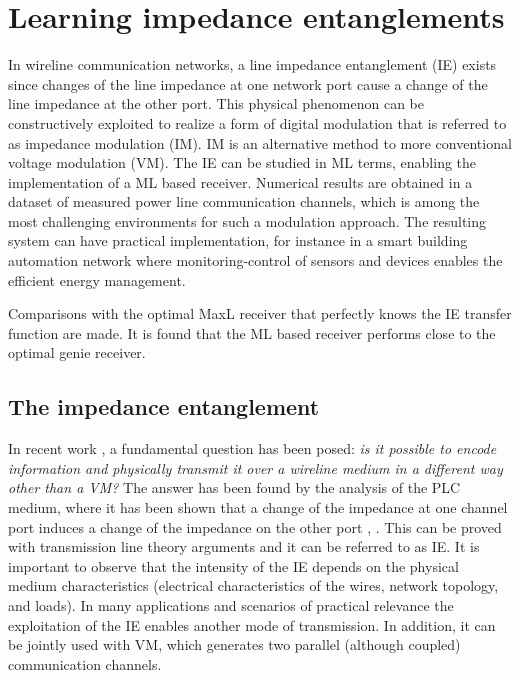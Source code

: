 \section{Learning impedance entanglements}
\label{sec:plc_entanglement}
In wireline communication networks, a line impedance entanglement (IE) exists since changes of the line impedance at one network port cause a change of the line impedance at the other port. This physical phenomenon can be constructively exploited to realize a form of digital modulation that is referred to as impedance modulation (IM). IM is an alternative method to more conventional voltage modulation (VM). The IE can be studied in ML terms, enabling the implementation of a ML based receiver. Numerical results are obtained in a dataset of measured power line communication channels, which is among the most challenging environments for such a modulation approach. The resulting system can have practical implementation, for instance in a smart building automation network where monitoring-control of sensors and devices enables the efficient energy management.

Comparisons with the optimal MaxL receiver that perfectly knows the IE transfer function are made. It is found that the ML based receiver performs close to the optimal genie receiver.

\subsection{The impedance entanglement}
In recent work \cite{TonelloIsplc2020}, a fundamental question has been posed: \emph{is it possible to encode information and physically transmit it over a wireline medium in a different way other than a VM?} The answer has been found by the analysis of the PLC medium, where it has been shown that a change of the impedance at one channel port induces a change of the impedance on the other port \cite{tcas}, \cite{tee}. This can be proved with transmission line theory arguments and it can be referred to as IE. It is important to observe that the intensity of the IE depends on the physical medium characteristics (electrical characteristics of the wires, network topology, and loads). In many applications and scenarios of practical relevance the exploitation of the IE enables another mode of transmission. In addition, it can be jointly used with VM, which generates two parallel (although coupled) communication channels.

